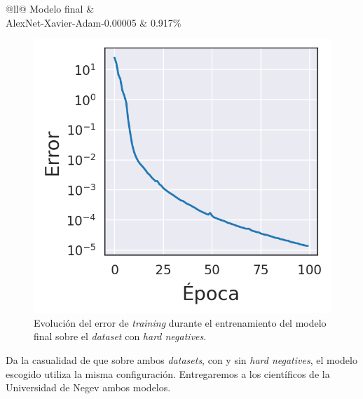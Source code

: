 \begin{table}[H]
    \footnotesize
    \centering
    \caption{Porcentaje de error del modelo final con \textit{hard negatives}.}
\begin{tabular}{@{}ll@{}}
\toprule
Modelo final              &  \\ \midrule
AlexNet-Xavier-Adam-0.00005 & 0.917\%                                                                                        \\ \bottomrule
\end{tabular}
\end{table}

\begin{figure}[H]
\centering
    \includegraphics[scale=0.67]{imagenes/image_classification/synthetic_dataset/loss_final_model.png}
    \caption{Evolución del error de \textit{training} durante el entrenamiento del modelo final sobre el \textit{dataset} con \textit{hard negatives}.}
\end{figure}

Da la casualidad de que sobre ambos \textit{datasets}, con y sin \textit{hard negatives}, el modelo escogido utiliza la misma configuración.  Entregaremos a los científicos de la Universidad de Negev ambos modelos.